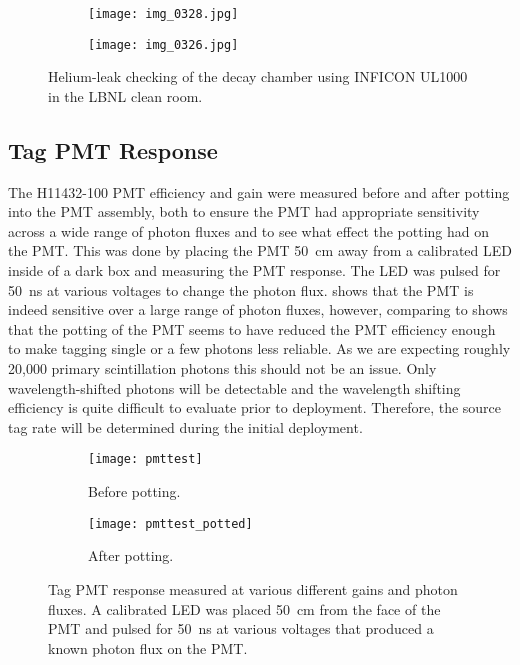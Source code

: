 \begin{figure}
        \centering
        \begin{subfigure}[b]{0.48\textwidth}
                \centering
                \texttt{[image: img\_0328.jpg]}
                \caption{}
                \label{fig:HeLeakCheckSetup}
        \end{subfigure}%
        \vspace{0.2cm}
        \begin{subfigure}[b]{0.45\textwidth}
                \centering
                \texttt{[image: img\_0326.jpg]}
                \caption{}
                \label{fig:HeLeakCheckResult}
        \end{subfigure}
        \caption{Helium-leak checking of the decay chamber using INFICON UL1000 in the LBNL clean room.}
\label{fig:HeLeakCheck}
\end{figure}

\subsection{Tag PMT Response}
\label{sec:tagpmt}
The H11432-100 PMT efficiency and gain were measured before and after potting into the PMT assembly, both to ensure the PMT had appropriate sensitivity across a wide range of photon fluxes and to see what effect the potting had on the PMT. 
This was done by placing the PMT 50~cm away from a calibrated LED inside of a dark box and measuring the PMT response.
The LED was pulsed for 50~ns at various voltages to change the photon flux. 
 shows that the PMT is indeed sensitive over a large range of photon fluxes, however, comparing  to  shows that the potting of the PMT seems to have reduced the PMT efficiency enough to make tagging single or a few photons less reliable. 
As we are expecting roughly 20,000 primary scintillation photons this should not be an issue. 
Only wavelength-shifted photons will be detectable and the wavelength shifting efficiency is quite difficult to evaluate prior to deployment.
Therefore, the source tag rate will be determined during the initial deployment.

\begin{figure}
    \begin{subfigure}{0.49\textwidth}
        \caption{Before potting.}
        \label{fig:pmttest}
        \texttt{[image: pmttest]}
    \end{subfigure}%
    \begin{subfigure}{0.49\textwidth}
        \caption{After potting.}
        \label{fig:pmtafterpotting}
        \texttt{[image: pmttest\_potted]}
    \end{subfigure}
    \caption{Tag PMT response measured at various different gains and photon fluxes. A calibrated LED was placed 50~cm from the face of the PMT and pulsed for 50~ns at various voltages that produced a known photon flux on the PMT.}
	\label{fig:calibratedled}
\end{figure}

